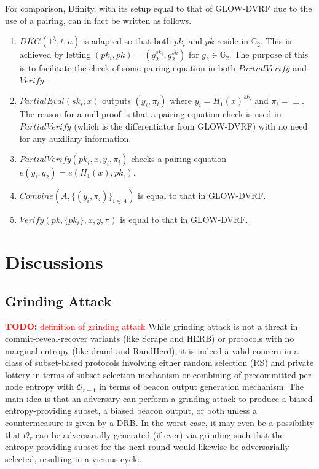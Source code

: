 \documentclass[letterpaper,twocolumn,10pt]{article}
\theoremstyle{definition}
\theoremstyle{remark}
\newcommand{\todo}[1]{\textcolor{red}{\textbf{TODO:} #1}}
\begin{document}
For comparison, Dfinity, with its setup equal to that of GLOW-DVRF due to the use of a pairing, can in fact be written as follows.
\begin{enumerate}
\item $DKG(1^\lambda, t, n)$ is adapted so that both $pk_i$ and $pk$ reside in $\mathbb{G}_2$. This is achieved by letting $(pk_i, pk) = (g_2^{sk_i}, g_2^{sk})$ for $g_2 \in \mathbb{G}_2$. The purpose of this is to facilitate the check of some pairing equation in both $PartialVerify$ and $Verify$.
\item $PartialEval(sk_i, x)$ outputs $(y_i, \pi_i)$ where $y_i = H_1(x)^{sk_i}$ and $\pi_i = \text{$\perp$}$. The reason for a null proof is that a pairing equation check is used in $PartialVerify$ (which is the differentiator from GLOW-DVRF) with no need for any auxiliary information.
\item $PartialVerify(pk_i, x, y_i, \pi_i)$ checks a pairing equation $e(y_i, g_2) = e(H_1(x), pk_i)$.
\item $Combine(A, \{(y_i, \pi_i)\}_{i \in A})$ is equal to that in GLOW-DVRF.
\item $Verify(pk, \{pk_i\}, x, y, \pi)$ is equal to that in GLOW-DVRF.
\end{enumerate}

\section{Discussions}
\subsection{Grinding Attack}
\todo{definition of grinding attack}
While grinding attack is not a threat in commit-reveal-recover variants (like Scrape and HERB) or protocols with no marginal entropy (like drand and RandHerd), it is indeed a valid concern in a class of subset-based protocols involving either random selection (RS) and private lottery in terms of subset selection mechanism or combining of precommitted per-node entropy with $\mathcal{O}_{r - 1}$ in terms of beacon output generation mechanism. The main idea is that an adversary can perform a grinding attack to produce a biased entropy-providing subset, a biased beacon output, or both unless a countermeasure is given by a DRB. In the worst case, it may even be a possibility that $\mathcal{O}_r$ can be adversarially generated (if ever) via grinding such that the entropy-providing subset for the next round would likewise be adversarially selected, resulting in a vicious cycle.
\end{document}
